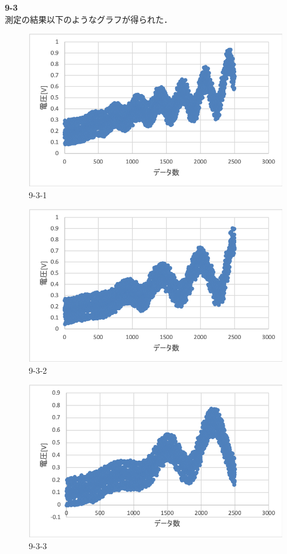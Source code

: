 \documentclass[11pt, a4paper,twocolumn]{jarticle}
\begin{document}
\noindent
\textbf{9-3} \\
測定の結果以下のようなグラフが得られた．

\begin{figure}[ht]
 \begin{center}
  \includegraphics[width=0.8\linewidth]{fig22.png}
 \end{center}
 \caption{9-3-1}
 \label{fig:22}
\end{figure}

\begin{figure}[ht]
 \begin{center}
  \includegraphics[width=0.8\linewidth]{fig23.png}
 \end{center}
 \caption{9-3-2}
 \label{fig:23}
\end{figure}

\begin{figure}[ht]
 \begin{center}
  \includegraphics[width=0.8\linewidth]{fig24.png}
 \end{center}
 \caption{9-3-3}
 \label{fig:24}
\end{figure}
\end{document}
